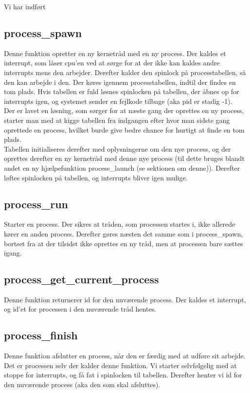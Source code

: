 \documentclass[10pt,a4paper,danish]{article}
\begin{document}
Vi har indført

\subsection{process\_spawn}
Denne funktion opretter en ny kernetråd med en ny process. Der kaldes et interrupt, som låser cpu'en ved at sørge for at der ikke kan kaldes andre interrupts mens den arbejder. Derefter kalder den spinlock på processtabellen, så den kan arbejde i den. Der køres igennem processtabellen, indtil der findes en tom plads. Hvis tabellen er fuld løsnes spinlocken på tabellen, der åbnes op for interrupts igen, og systemet sender en fejlkode tilbage (aka pid er stadig -1).\\

Der er lavet en løsning, som sørger for at næste gang der oprettes en ny process, starter man med at kigge tabellen fra indgangen efter hvor man sidste gang oprettede en process, hvilket burde give bedre chance for hurtigt at finde en tom plads.\\

Tabellen initialiseres derefter med oplysningerne om den nye process, og der oprettes derefter en ny kernetråd med denne nye process (til dette bruges blandt andet en ny hjælpefunktion process\_launch (se sektionen om denne)). Derefter løftes spinlocken på tabellen, og interrupts bliver igen mulige. 

\subsection{process\_run}
Starter en process. Der sikres at tråden, som processen startes i, ikke allerede kører en anden process. Derefter gøres næsten det samme som i process\_spawn, bortset fra at der tilsidst ikke oprettes en ny tråd, men at processen bare sættes igang.

\subsection{process\_get\_current\_process}
Denne funktion returnerer id for den nuværende process. Der kaldes et interrupt, og id'et for processen i den nuværende tråd hentes.

\subsection{process\_finish}
Denne funktion afslutter en process, når den er færdig med at udføre sit arbejde. Det er processen selv der kalder denne funktion. Vi starter selvfølgelig med at stoppe for interrupts, og få fat i spinlocken til tabellen. Derefter henter vi id for den nuværende process (aka den som skal afsluttes).\\
\end{document}
